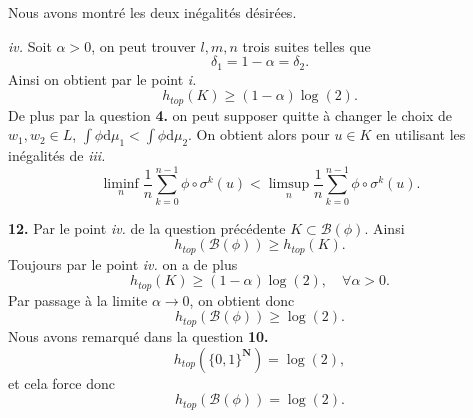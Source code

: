 \documentclass[12pt]{article}
\newcommand{\N}{\mathbf{N}}
\newcommand{\de}{\mathrm{d}}
\begin{document}
Nous avons montré les deux inégalités désirées.
\medskip

\textit{iv.} Soit $\alpha > 0$, on peut trouver $l, m, n$ trois suites telles que  \[
\delta_{1} = 1 - \alpha = \delta_{2}
.\] 
Ainsi on obtient par le point \textit{i.} \[
h_{top}(K) \ge (1-\alpha)\log(2)
.\] De plus par la question \textbf{4.} on peut supposer quitte à changer le choix de $w_{1}, w_{2} \in L$, $\int\phi\de\mu_{1} < \int\phi\de\mu_{2}$. On obtient alors pour $u \in K$ en utilisant les inégalités de \textit{iii.}
\[
        \liminf_{n}\frac{1}{n}\sum_{k=0}^{n-1} \phi\circ\sigma^{k}(u) < \limsup_{n}\frac{1}{n}\sum_{k=0}^{n-1} \phi\circ\sigma^{k}(u)
.\] 

\medskip

\textbf{12.} Par le point \textit{iv.} de la question précédente $K \subset \mathcal{B}(\phi)$. Ainsi \[
        h_{top}(\mathcal{B}(\phi)) \ge h_{top}(K)
.\] Toujours par le point \textit{iv.} on a de plus  \[
h_{top}(K) \ge (1-\alpha)\log(2), \quad \forall \alpha > 0
.\]
Par passage à la limite $\alpha \to 0$, on obtient donc \[
        h_{top}(\mathcal{B}(\phi)) \ge \log(2)
.\] 
Nous avons remarqué dans la question \textbf{10.} \[
        h_{top}(\{0,1\}^{\N}) = \log(2)
,\] et cela force donc \[
h_{top}(\mathcal{B}(\phi)) = \log(2)
.\]  
\end{document}
